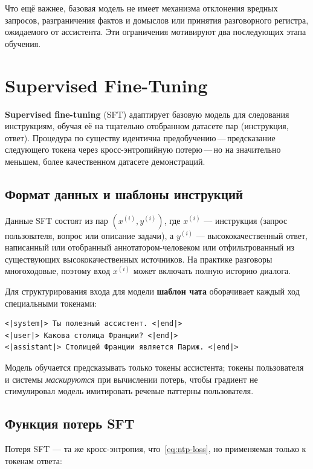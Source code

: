 Что ещё важнее, базовая модель не имеет механизма отклонения вредных запросов, разграничения фактов и домыслов или принятия разговорного регистра, ожидаемого от ассистента. Эти ограничения мотивируют два последующих этапа обучения.

\section{Supervised Fine-Tuning}
\label{sec:sft}

\textbf{Supervised fine-tuning} (SFT) адаптирует базовую модель для следования инструкциям, обучая её на тщательно отобранном датасете пар (инструкция, ответ). Процедура по существу идентична предобучению\,---\,предсказание следующего токена через кросс-энтропийную потерю\,---\,но на значительно меньшем, более качественном датасете демонстраций.

\subsection{Формат данных и шаблоны инструкций}

Данные SFT состоят из пар $(x^{(i)}, y^{(i)})$, где $x^{(i)}$ --- инструкция (запрос пользователя, вопрос или описание задачи), а $y^{(i)}$ --- высококачественный ответ, написанный или отобранный аннотатором-человеком или отфильтрованный из существующих высококачественных источников. На практике разговоры многоходовые, поэтому вход $x^{(i)}$ может включать полную историю диалога.

Для структурирования входа для модели \textbf{шаблон чата} оборачивает каждый ход специальными токенами:
\begin{verbatim}
<|system|> Ты полезный ассистент. <|end|>
<|user|> Какова столица Франции? <|end|>
<|assistant|> Столицей Франции является Париж. <|end|>
\end{verbatim}
Модель обучается предсказывать только токены ассистента; токены пользователя и системы \emph{маскируются} при вычислении потерь, чтобы градиент не стимулировал модель имитировать речевые паттерны пользователя.

\subsection{Функция потерь SFT}

Потеря SFT --- та же кросс-энтропия, что~\eqref{eq:ntp-loss}, но применяемая только к токенам ответа:

